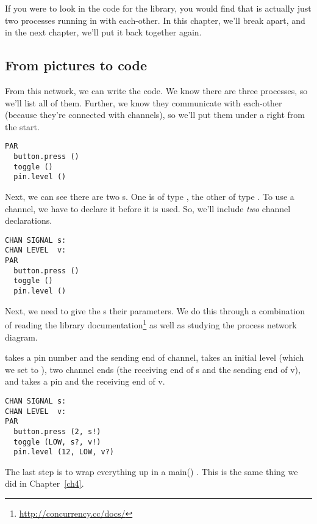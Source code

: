 If you were to look in the code for the \plumbing library, you would find that \tp is actually just two processes running in \PARallel with each-other. In this chapter, we'll break \tp apart, and in the next chapter, we'll put it back together again.

\newpage

\subsection{From pictures to code}
From this network, we can write the code. We know there are three processes, so we'll list all of them. Further, we know they communicate with each-other (because they're connected with channels), so we'll put them under a \PAR right from the start.

\vspace{3mm}
\begin{lstlisting}
PAR
  button.press ()
  toggle ()
  pin.level ()
\end{lstlisting}

Next, we can see there are two {\CHANnel}s. One is of type \SIGNALT, the other of type \LEVELT. To use a channel, we have to declare it before it is used. So, we'll include {\em two} channel declarations.

\vspace{3mm}
\begin{lstlisting}
CHAN SIGNAL s:
CHAN LEVEL  v:
PAR
  button.press ()
  toggle ()
  pin.level ()
\end{lstlisting}

Next, we need to give the {\PROCedure}s their parameters. We do this through a combination of reading the \plumbing library documentation\footnote{\url{http://concurrency.cc/docs/}} as well as studying the process network diagram.

\newpage

\bp takes a pin number and the sending end of channel, \toggle takes an initial level (which we set to \LOW), two channel ends (the receiving end of {\code s} and the sending end of {\code v}), and \pinlevel takes a pin and the receiving end of {\code v}.

\vspace{3mm}
\begin{lstlisting}
CHAN SIGNAL s:
CHAN LEVEL  v:
PAR
  button.press (2, s!)
  toggle (LOW, s?, v!)
  pin.level (12, LOW, v?)
\end{lstlisting}

\vspace{3mm}
The last step is to wrap everything up in a {\code main()} \PROCedure. This is the same thing we did in Chapter~\ref{ch4}.

